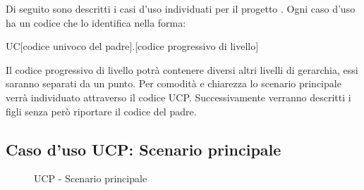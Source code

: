 Di seguito sono descritti i casi d'uso individuati per il progetto \PROGETTO. Ogni caso d'uso ha un codice che lo identifica nella forma:
\begin{center}
	UC[codice univoco del padre].[codice progressivo di livello]
\end{center}
Il codice progressivo di livello potrà contenere diversi altri livelli di gerarchia, essi saranno separati da un punto. Per comodità e chiarezza lo scenario principale verrà individuato attraverso il codice UCP. Successivamente verranno descritti i figli senza però riportare il codice del padre.

\subsection{Caso d'uso UCP: Scenario principale}
\begin{figure}[h] 
	\centering 
	\caption{UCP - Scenario principale} 
\end{figure}

\newpage

